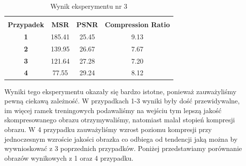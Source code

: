 \documentclass[12pt]{article}
\begin{document}
\begin{table}[h!]
 \caption{Wynik eksperymentu nr 3}
 \centering
 \vspace{0.2cm}
 \begin{tabular}{c c c c}
  \hline\hline\\[-0.4cm]
  \textbf{Przypadek} & \textbf{MSR} & \textbf{PSNR} & \textbf{Compression Ratio} \\[0.1cm]
  \textbf{1} & 185.41 & 25.45 & 9.13  \\
  \textbf{2} & 139.95 & 26.67 & 7.67  \\
  \textbf{3} & 121.64 & 27.28 & 7.20  \\
  \textbf{4} & 77.55 & 29.24 & 8.12  \\ [0.1cm]
  \hline
 \end{tabular}
 \label{wynik eksperymentu 3}
\end{table}

Wyniki tego eksperymentu okazały się bardzo istotne, ponieważ zauważyliśmy pewną ciekawą zależność. W przypadkach 1-3 wyniki były dość przewidywalne, im więcej ramek treningowych podawaliśmy na wejściu tym lepszą jakość skompresowanego obrazu otrzymywaliśmy, natomiast malał stopień kompresji obrazu. W 4 przypadku zauważyliśmy wzrost poziomu kompresji przy jednoczesnym wzroście jakości obrazka co odbiega od tendencji jaką można by wywnioskować z 3 poprzednich przypadków. Poniżej przedstawiamy porównanie obrazów wynikowych z 1 oraz 4 przypadku.
\end{document}

